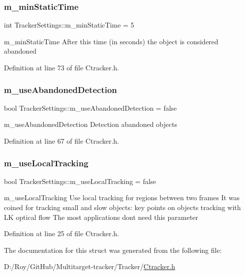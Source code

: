\subsubsection{\texorpdfstring{m\+\_\+min\+Static\+Time}{m\_minStaticTime}}
{\footnotesize\ttfamily int Tracker\+Settings\+::m\+\_\+min\+Static\+Time = 5}



m\+\_\+min\+Static\+Time After this time (in seconds) the object is considered abandoned 



Definition at line 73 of file Ctracker.\+h.

\mbox{\label{struct_tracker_settings_ad38082863e30ac990ff8d5b49a02ee70}} 
\subsubsection{\texorpdfstring{m\+\_\+use\+Abandoned\+Detection}{m\_useAbandonedDetection}}
{\footnotesize\ttfamily bool Tracker\+Settings\+::m\+\_\+use\+Abandoned\+Detection = false}



m\+\_\+use\+Abandoned\+Detection Detection abandoned objects 



Definition at line 67 of file Ctracker.\+h.

\mbox{\label{struct_tracker_settings_a64f4e2f0b2eaeae47316690ab5a5e620}} 
\subsubsection{\texorpdfstring{m\+\_\+use\+Local\+Tracking}{m\_useLocalTracking}}
{\footnotesize\ttfamily bool Tracker\+Settings\+::m\+\_\+use\+Local\+Tracking = false}



m\+\_\+use\+Local\+Tracking Use local tracking for regions between two frames It was coined for tracking small and slow objects\+: key points on objects tracking with LK optical flow The most applications don\textquotesingle{}t need this parameter 



Definition at line 25 of file Ctracker.\+h.



The documentation for this struct was generated from the following file\+:\begin{DoxyCompactItemize}
\item 
D\+:/\+Roy/\+Git\+Hub/\+Multitarget-\/tracker/\+Tracker/\mbox{\hyperlink{_ctracker_8h}{Ctracker.\+h}}\end{DoxyCompactItemize}
